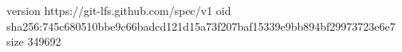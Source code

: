 version https://git-lfs.github.com/spec/v1
oid sha256:745c680510bbe9c66badcd121d15a73f207baf15339e9bb894bf29973723e6e7
size 349692
